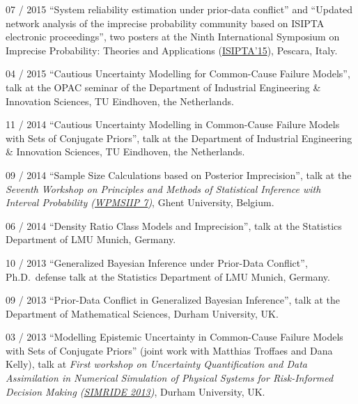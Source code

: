 \documentclass[a4paper]{simplecv}
\begin{document}
\begin{topic}
\item[07 / 2015] ``System reliability estimation under prior-data conflict'' and
                 ``Updated network analysis of the imprecise probability community based on ISIPTA electronic proceedings'',
                 two posters at the
                 Ninth International Symposium on Imprecise Probability: Theories and Applications
                 (\href{http://www.sipta.org/isipta15/}{ISIPTA'15}),
                 Pescara, Italy.

\item[04 / 2015] ``Cautious Uncertainty Modelling for Common-Cause Failure Models'', talk at the OPAC seminar of %
                 the Department of Industrial Engineering \& Innovation Sciences, TU Eindhoven, the Netherlands.

\item[11 / 2014] ``Cautious Uncertainty Modelling in Common-Cause Failure Models with Sets of Conjugate Priors'', talk at %
                 the Department of Industrial Engineering \& Innovation Sciences, TU Eindhoven, the Netherlands.

\item[09 / 2014] ``Sample Size Calculations based on Posterior Imprecision'', talk at the
                 \emph{Seventh Workshop on Principles and Methods of Statistical Inference with Interval Probability (\href{http://users.ugent.be/~slopatat/wpmsiip2014/index.html}{WPMSIIP 7})},
                 Ghent University, Belgium.

\item[06 / 2014] ``Density Ratio Class Models and Imprecision'',
                 talk at the Statistics Department of LMU Munich, Germany.

\item[10 / 2013] ``Generalized Bayesian Inference under Prior-Data Conflict'', Ph.D.\ defense talk at
                 the Statistics Department of LMU Munich, Germany.

\item[09 / 2013] ``Prior-Data Conflict in Generalized Bayesian Inference'', talk at
                 the Department of Mathematical Sciences, Durham University, UK.

\item[03 / 2013] ``Modelling Epistemic Uncertainty in Common-Cause Failure Models with Sets of Conjugate Priors''
                 (joint work with Matthias Troffaes and Dana Kelly), talk at
                 \emph{First workshop on Uncertainty Quantification and Data Assimilation in Numerical Simulation of Physical Systems
                 for Risk-Informed Decision Making (\href{http://www.maths.dur.ac.uk/users/matthias.troffaes/simride2013/}{SIMRIDE 2013})}, Durham University, UK.


\end{topic}
\end{document}
